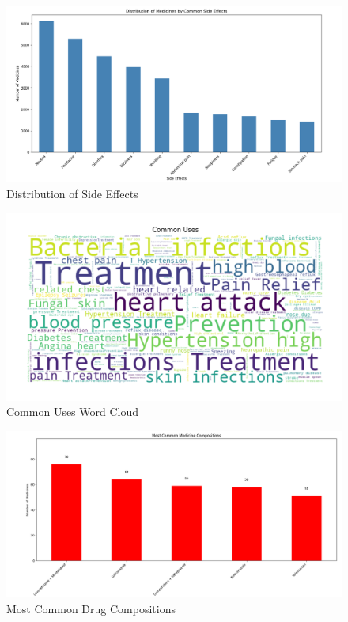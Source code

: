\documentclass[sigconf]{acmart}
\begin{document}
\begin{figure}[H]
	\centering
	\includegraphics[width=\linewidth]{graphic4.png}
	\caption{Distribution of Side Effects}
	\label{fig:sideEffectsDistribution}
  \end{figure}

\begin{figure}[H]
	\centering
	\includegraphics[width=\linewidth]{graphic5.png}
	\caption{Common Uses Word Cloud}
	\label{fig:commonUses}
  \end{figure}

\begin{figure}[H]
	\centering
	\includegraphics[width=\linewidth]{graphic6.png}
	\caption{Most Common Drug Compositions}
	\label{fig:commonDrugCompositions}
  \end{figure}
\end{document}
